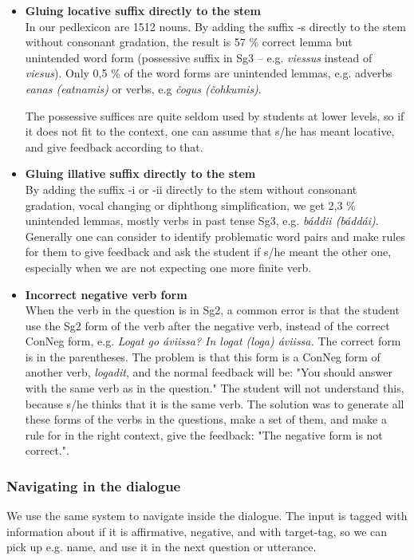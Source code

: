 \documentclass[a4paper,12pt]{article}
\begin{document}
\begin{itemize}

\item \textbf{Gluing locative suffix directly to the stem} \\
In our pedlexicon are 1512 nouns. By adding the suffix -s directly to the stem without consonant gradation, the result is 57 \% correct lemma but unintended word form (possessive suffix in Sg3 -- e.g. \textit{viessus} instead of \textit{viesus}). Only 0,5 \% of the word forms are unintended lemmas, e.g. adverbs \textit{eanas  (eatnamis)} or verbs, e.g \textit{čogus (čohkumis)}.

The possessive suffices are quite seldom used by students at lower levels, so if it does not fit to the context, one can assume that s/he has meant locative, and give feedback according to that. 

\item \textbf{Gluing illative suffix directly to the stem}\\
By adding the suffix -i or -ii directly to the stem without consonant gradation, vocal changing or diphthong simplification, we get 2,3 \% unintended lemmas, mostly verbs in past tense Sg3, e.g. \textit{báddii (báddái)}. Generally one can consider to identify problematic word pairs and make rules for them to give feedback and ask the student if s/he meant the other one, especially when we are not expecting one more finite verb.

\item \textbf{Incorrect negative verb form}\\
When the verb in the question is in Sg2, a common error is that the student use the Sg2 form of the verb after the negative verb, instead of the correct ConNeg form, e.g. \textit{Logat go áviissa? In logat (loga) áviissa.} The correct form is in the parentheses. The problem is that this form is a ConNeg form of another verb, \textit{logadit}, and the normal feedback will be: "You should answer with the same verb as in the question." The student will not understand this, because s/he thinks that it is the same verb. The solution was to generate all these forms of the verbs in the questions, make a set of them, and make a rule for in the right context, give the feedback: "The negative form is not correct.". 
\end{itemize}


\subsubsection{Navigating in the dialogue}
We use the same system to navigate inside the dialogue. The input is tagged with information about if it is affirmative, negative, and with target-tag, so we can pick up e.g. name, and use it in the next question or utterance. 
\end{document}
